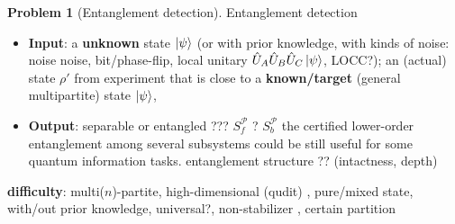 \documentclass[
aps,
pra,
floatfix,
]{revtex4-2}
\theoremstyle{plain}
\theoremstyle{definition}
\newtheorem{problem}{Problem}
\newcommand{\separable}{S}
\newcommand{\U}{\hat{U}}
\newcommand{\ppartition}{\mathcal{P}}
\newcommand{\dm}{\rho}
\begin{document}
\begin{problem}[Entanglement detection]\label{prm:separable}
	Entanglement detection
	\begin{itemize}
		\item \textbf{Input}: a \textbf{unknown} state $\ket{\psi}$ (or with prior knowledge, with kinds of noise: noise noise, bit/phase-flip, local unitary $\U_A\U_B\U_C\ket{\psi}$, LOCC?);
		an (actual) state $\dm'$ from experiment that is close to a \textbf{known/target} (general multipartite) state $\ket{\psi}$,

		\item \textbf{Output}: \textsf{separable} or \textsf{entangled} ??? $\separable_f^\ppartition$ ? $\separable_b^\ppartition$ 
		the certified lower-order entanglement among several subsystems could be still useful for some quantum information tasks.
		entanglement structure \textsf{}?? (intactness, depth)
	\end{itemize}
	\textbf{difficulty}: multi($n$)-partite, high-dimensional (qudit) \cite{sciaraUniversalPartiteLevel2019}, pure/mixed state, with/out prior knowledge, universal?, non-stabilizer \cite{tothEntanglementDetectionStabilizer2005}, certain partition
\end{problem}
\end{document}

